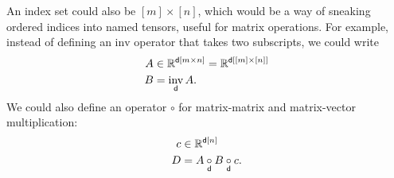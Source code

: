 An index set could also be $[m] \times [n]$, which would be a way of sneaking ordered indices into named tensors, useful for matrix operations. For example, instead of defining an $\text{inv}$ operator that takes two subscripts, we could write
\begin{align*}
  A &\in \mathbb{R}^{\nset{d}{{m\times n}}} = \mathbb{R}^{\nset{d}{{[m]\times [n]}}} \\
  B &= \nfun{d}{inv} A.
\end{align*}
We could also define an operator $\circ$ for matrix-matrix and matrix-vector multiplication:
\begin{align*}
  c &\in \mathbb{R}^{\nset{d}{n}} \\
  D &= A \nbin{d}{\circ} B \nbin{d}{\circ} c.
\end{align*}
